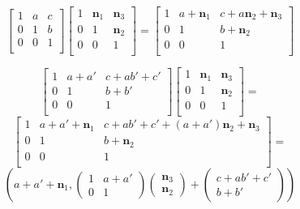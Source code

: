 \documentclass[A4paper,11pt]{amsart}
\theoremstyle{definition}
\theoremstyle{named}
\begin{document}
 \begin{equation}
 {\begin{bmatrix}1&a&c\\0&1&b\\0&0&1\\\end{bmatrix}}
 {\begin{bmatrix}1&\mathbf{n}_1&\mathbf{n}_3\\0&1&\mathbf{n}_2\\0&0&1\\\end{bmatrix}}={\begin{bmatrix}1&a+\mathbf{n}_1&c+a\mathbf{n}_2+\mathbf{n}_3\\0&1&b+\mathbf{n}_2\\0&0&1\\\end{bmatrix}}
  \end{equation}
  
  \begin{equation}
  {\begin{bmatrix}1&a+a'&c+ab'+c'\\0&1&b+b'\\0&0&1\\\end{bmatrix}}
   {\begin{bmatrix}1&\mathbf{n}_1&\mathbf{n}_3\\0&1&\mathbf{n}_2\\0&0&1\\\end{bmatrix}}=
   \end{equation}
   \[
  {\begin{bmatrix}1&a+a'+\mathbf{n}_1&c+ab'+c'+(a+a')\mathbf{n}_2+\mathbf{n}_3\\0&1&b+\mathbf{n}_2\\0&0&1\\\end{bmatrix}}=
  \]
  \[
  \left(a+a'+\mathbf{n}_1,\begin{pmatrix}1&a+a'\\0&1\end{pmatrix}\begin{pmatrix}\mathbf{n}_3\\\mathbf{n}_2\end{pmatrix}+\begin{pmatrix}c+ab'+c'\\b+b'\end{pmatrix}\right)
  \]
 
\end{document}
